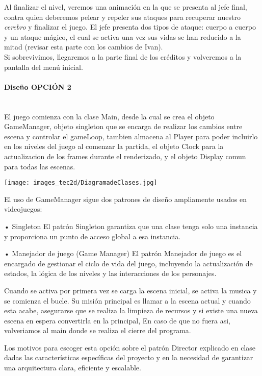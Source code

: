 \documentclass[12pt,a4paper,twoside,spanish]{article}      %
\begin{document}
\begin{itemize}
    Al finalizar el nivel, veremos una animación en la que se presenta al jefe final, contra quien deberemos pelear y repeler sus ataques para recuperar nuestro \emph{cerebro} y finalizar el juego. El jefe presenta dos tipos de ataque: cuerpo a cuerpo y un ataque mágico, el cual se activa una vez sus vidas se han reducido a la mitad (revisar esta parte con los cambios de Ivan).\\[1mm]
    Si sobrevivimos, llegaremos a la parte final de los créditos y volveremos a la pantalla del menú inicial.
\end{itemize}

\paragraph{Diseño OPCIÓN 2}\mbox{}\\

El juego comienza con la clase Main, desde la cual se crea el objeto GameManager, objeto singleton que se encarga de realizar los cambios entre escena y controlar el gameLoop, tambien almacena al Player para poder incluirlo en los niveles del juego al comenzar la partida, el objeto Clock para la actualizacion de los frames durante el renderizado, y el objeto Display comun para todas las escenas.
\begin{center}
    \texttt{[image: images\_tec2d/DiagramadeClases.jpg]}
\end{center}

El uso de GameManager sigue dos patrones de diseño  ampliamente usados en videojuegos:

•	Singleton El patrón Singleton garantiza que una clase tenga solo una instancia y proporciona un punto de acceso global a esa instancia.

•	Manejador de juego (Game Manager) El patrón Manejador de juego es el encargado de gestionar el ciclo de vida del juego, incluyendo la actualización de estados, la lógica de los niveles y las interacciones de los personajes.

Cuando se activa por primera vez se carga la escena inicial, se activa la musica y se comienza el bucle. Su misión principal es llamar a la escena actual y cuando esta acabe, asegurarse que se realiza la limpieza de recursos y si existe una nueva escena en espera convertirla en la principal, En caso de que no fuera asi, volveriamos al main donde se realiza el cierre del programa.

Los motivos para escoger esta opción sobre el patrón Director explicado en clase dadas las características específicas del proyecto y en la necesidad de garantizar una arquitectura clara, eficiente y escalable.
\end{document}
